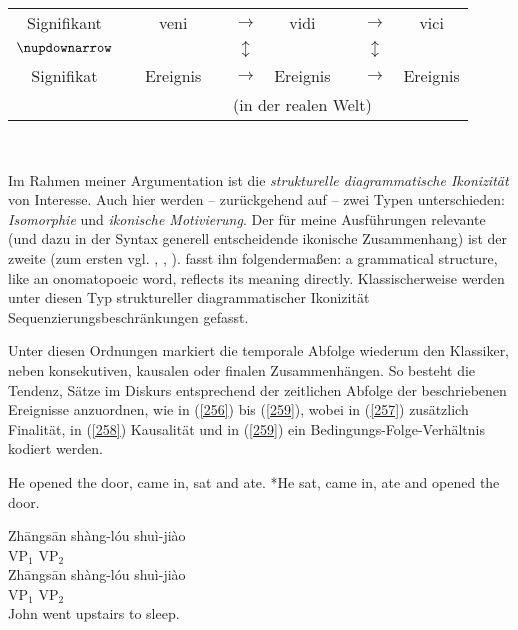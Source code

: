 \begin{exe}
\ex\label{255}
\begin{tabular}[t]{ccccccccc}
  	Signifikant & & veni & & $\rightarrow$ & vidi & & $\rightarrow$ & vici\\
  	$\nupdownarrow$ & & & & $\updownarrow$ & & & $\updownarrow$ & \\
  	Signifikat & & \glq Ereignis\grq {} & & $\rightarrow$  & \glq Ereignis\grq {} & & $\rightarrow$ & \glq Ereignis\grq {}\\
  	& & & \multicolumn{5}{c}{(in der realen Welt)} &\\	
\end{tabular}\\
\hbox{}\hfill\hbox{\citet[xxii]{Fischer1999}}
\end{exe}
Im Rahmen meiner Argumentation ist die \textit{strukturelle diagrammatische Ikoni\-zität}  von Interesse. Auch hier werden – zurückgehend auf \citet{Haiman1980} – zwei Typen unterschieden: \textit{Isomorphie}  und  \textit{ikonische Motivierung}. Der für meine Ausführungen relevante (und dazu in der Syntax generell entscheidende ikonische Zusammenhang) ist der zweite (zum ersten vgl. \citealt[516]{Haiman1980}, \citealt{Schachter1973}, \citealt{Bickel1995}). \citet[516]{Haiman1980} fasst ihn folgendermaßen: \glqq a gramma\-tical structure, like an onomatopoeic word, reflects its meaning directly\grqq{}. Klassischerweise werden unter diesen Typ struktureller diagrammatischer Ikonizität Sequenzierungsbeschrän\-kungen gefasst.

Unter diesen Ordnungen markiert die temporale Abfolge wiederum den Klassiker, neben konsekutiven, kausalen oder finalen Zusammenhängen. So besteht die Tendenz, Sätze im Diskurs entsprechend der zeitlichen Abfolge der beschriebenen Ereignisse anzuordnen, wie in (\ref{256}) bis (\ref{259}), wobei in (\ref{257}) zusätzlich Finalität, in (\ref{258}) Kausalität und in (\ref{259}) ein Bedingungs-Folge-Verhältnis kodiert werden.

\begin{exe}
	\ex\label{256} 
		\begin{xlist}	
			\ex\label{256a} He opened the door, came in, sat and ate.
			\ex\label{256b} *He sat, came in, ate and opened the door.
			\hfill\hbox {\citet[92]{Givon1991}}
		\end{xlist}
\end{exe}

\begin{exe}
	\ex\label{257} 
		\begin{xlist}	
			\ex\label{257a} 
			\gll Zh\={a}ngs\={a}n sh\`{a}ng-l\'{o}u shu\`{i}-ji\`{a}o\\
			{} {$\textrm{VP}_{1}$} {$\textrm{VP}_{2}$}\\
			\ex\label{257b}
			\gll *Zh\={a}ngs\={a}n sh\`{a}ng-l\'{o}u shu\`{i}-ji\`{a}o\\
			{} {$\textrm{VP}_{1}$} {$\textrm{VP}_{2}$}\\
			\glt John went upstairs to sleep.
			\hfill\hbox {\citet[51]{Tai1985}}
		\end{xlist}
\end{exe}

